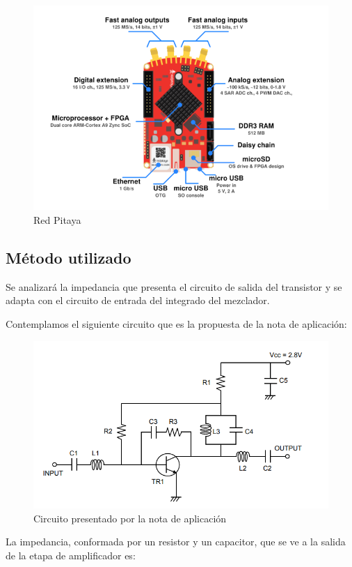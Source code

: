 \documentclass{article}
\begin{document}
\begin{figure}[H]
  \centering
    \includegraphics[scale=0.7]{PITAYA}
  \caption{ Red Pitaya }
\end{figure}

\subsection{Método utilizado}
Se analizará la impedancia que presenta el circuito de salida del transistor y se adapta con el circuito de entrada del integrado del mezclador.


Contemplamos el siguiente circuito que es la propuesta de la nota de aplicación:

\begin{figure}[H]
  \centering
    \includegraphics[scale=0.55]{ADAPT0}
  \caption{ Circuito presentado por la nota de aplicación}
\end{figure}
La impedancia, conformada por un resistor y un capacitor, que se ve a la salida de la etapa de amplificador es:
\end{document}
